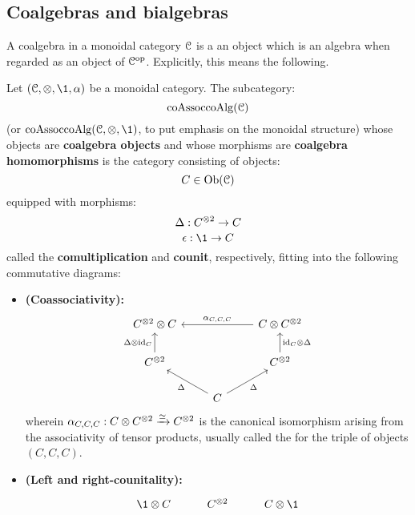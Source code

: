     \subsection{Coalgebras and bialgebras}
        A coalgebra in a monoidal category $\C$ is a an object which is an algebra when regarded as an object of $\C^{\op}$. Explicitly, this means the following.
        \begin{definition} \label{def: coalgebras_in_monoidal_categories}
            Let $(\C, \tensor, \1, \alpha)$ be a monoidal category. The subcategory:
                $$\co\Assoc\co\Alg(\C)$$
            (or $\co\Assoc\co\Alg(\C, \tensor, \1)$, to put emphasis on the monoidal structure) whose objects are \textbf{coalgebra objects} and whose morphisms are \textbf{coalgebra homomorphisms} is the category consisting of objects:
                $$C \in \Ob(\C)$$
            equipped with morphisms:
                $$\Delta: C^{\tensor 2} \to C$$
                $$\e: \1 \to C$$
            called the \textbf{comultiplication} and \textbf{counit}, respectively, fitting into the following commutative diagrams:
            \begin{itemize}
                \item \textbf{(Coassociativity):}
                    $$
                        \begin{tikzcd}
                        {C^{\tensor 2} \tensor C} && {C \tensor C^{\tensor 2}} \\
                        {C^{\tensor 2}} && {C^{\tensor 2}} \\
                        & C
                        \arrow["{\alpha_{C, C, C}}"', from=1-3, to=1-1]
                        \arrow["{\Delta \tensor \id_C}", from=2-1, to=1-1]
                        \arrow["{\id_C \tensor \Delta}"', from=2-3, to=1-3]
                        \arrow["\Delta", from=3-2, to=2-1]
                        \arrow["\Delta"', from=3-2, to=2-3]
                        \end{tikzcd}
                    $$
                wherein $\alpha_{C, C, C}: C \tensor C^{\tensor 2} \xrightarrow[]{\cong} C^{\tensor 2}$ is the canonical isomorphism arising from the associativity of tensor products, usually called the  for the triple of objects $(C, C, C)$. 
                \item \textbf{(Left and right-counitality):}
                    $$
                        \begin{tikzcd}
                    	{\1 \tensor C} & {C^{\tensor 2}} & {C \tensor \1} \\

\end{tikzcd}$$
\end{itemize}
\end{definition}
